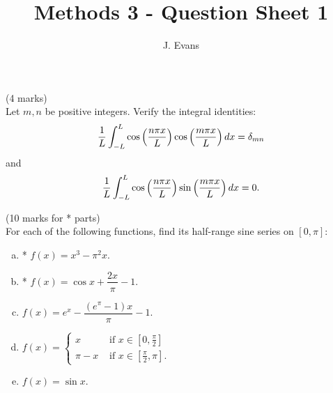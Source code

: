 \documentclass[12pt]{article}
\title{Methods 3 - Question Sheet 1}
\author{J. Evans}
\date{}
\begin{document}
\maketitle

\begin{question}(4 marks)\\
Let $m,n$ be positive integers. Verify the integral identities:
\[
\frac{1}{L}\int_{-L}^L\cos\left(\frac{n \pi x}{L}\right)\cos\left(\frac{m \pi x}{L}\right)dx=\delta_{mn}
\]
and
\[
\frac{1}{L}\int_{-L}^L\cos\left(\frac{n \pi x}{L}\right)\sin\left(\frac{m \pi x}{L}\right)dx= 0.
\]
\end{question}

\vspace{0.5cm}

\begin{question}(10 marks for * parts)\\
For each of the following functions, find its half-range sine series on $[0,\pi]$:
\begin{enumerate}[(a)]
\item * $f(x)=x^3-\pi^2x$.
\item * $f(x)=\cos x+\dfrac{2x}{\pi}-1$.
\item $f(x)=e^x-\dfrac{(e^{\pi}-1)x}{\pi}-1$.
\item $f(x)=\begin{cases}x&\mbox{ if }x\in\left[0,\tfrac{\pi}{2}\right]\\ \pi-x&\mbox{ if }x\in\left[\tfrac{\pi}{2},\pi\right].\end{cases}$
\item $f(x)=\sin x$.
\end{enumerate}
\end{question}
\end{document}
